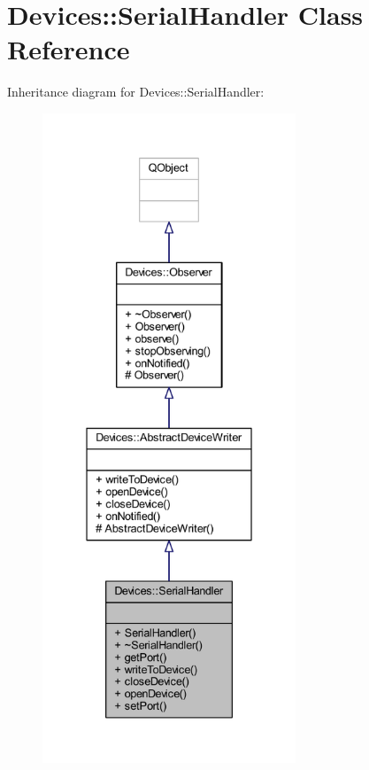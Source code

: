 \hypertarget{class_devices_1_1_serial_handler}{}\section{Devices\+:\+:Serial\+Handler Class Reference}
\label{class_devices_1_1_serial_handler}


Inheritance diagram for Devices\+:\+:Serial\+Handler\+:\nopagebreak
\begin{figure}[H]
\begin{center}
\leavevmode
\includegraphics[height=550pt]{d2/dc5/class_devices_1_1_serial_handler__inherit__graph}
\end{center}
\end{figure}


